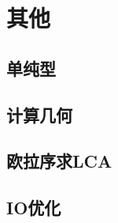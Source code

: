 \documentclass[a4paper,12pt]{article}
\begin{document}
\section{其他}

\subsection{单纯型}

\subsection{计算几何}

\subsection{欧拉序求LCA}

\subsection{IO优化}



\label{LastPage}
\end{document}
